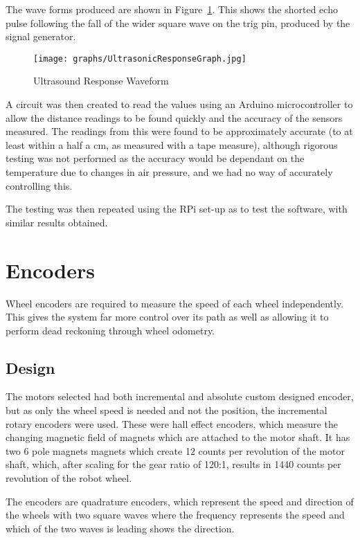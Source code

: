 The wave forms produced are shown in Figure~\ref{UltrasoundWaveform}.
This shows the shorted echo pulse following the fall of the wider
square wave on the trig pin, produced by the signal generator.

\begin{figure}[!ht]
	\centering
	\texttt{[image: graphs/UltrasonicResponseGraph.jpg]}
	\caption{Ultrasound Response Waveform}\label{UltrasoundWaveform}

\end{figure}

A circuit was then created to read the values using an Arduino
microcontroller to allow the distance readings to be found quickly
and the accuracy of the sensors measured. The readings from this were
found to be approximately accurate (to at least within a half a cm,
as measured with a tape measure), although rigorous testing was not
performed as the accuracy would be dependant on the temperature due
to changes in air pressure, and we had no way of accurately controlling
this.

The testing was then repeated using the RPi set-up as to test the
software, with similar results obtained.

\section{Encoders}\label{elec/encoder}
Wheel encoders are required to measure the speed of each wheel
independently. This gives the system far more control over its path
as well as allowing it to perform dead reckoning through wheel odometry.

\subsection{Design}\label{elec/encoder/design}
The motors selected had both incremental and absolute custom designed
encoder, but as only the wheel speed is needed and not the position,
the incremental rotary encoders were used. These were hall effect
encoders, which measure the changing magnetic field of magnets which
are attached to the motor shaft. It has two 6 pole magnets magnets
which create 12 counts per revolution of the motor shaft, which, after
scaling for the gear ratio of 120:1, results in 1440 counts per
revolution of the robot wheel.

The encoders are quadrature encoders, which represent the speed and
direction of the wheels with two square waves where the frequency
represents the speed and which of the two waves is leading shows the
direction.


